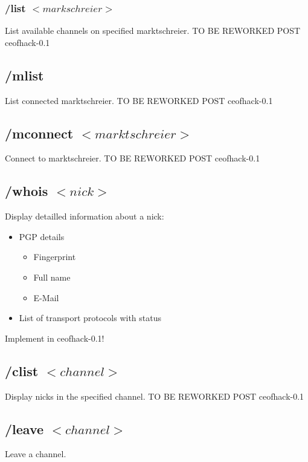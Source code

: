 \documentclass[12pt,a4paper]{book}
\begin{document}
\subsubsection{/list $<markschreier>$}
List available channels on specified marktschreier.
TO BE REWORKED
POST ceofhack-0.1

\subsection{/mlist}
List connected marktschreier.
TO BE REWORKED
POST ceofhack-0.1

\subsection{/mconnect $<marktschreier>$}
Connect to marktschreier.
TO BE REWORKED
POST ceofhack-0.1

\subsection{/whois $<nick>$}
Display detailled information about a nick:
\begin{itemize}
\item PGP details
\begin{itemize}
\item Fingerprint
\item Full name
\item E-Mail
\end{itemize}
\item List of transport protocols with status
\end{itemize}

Implement in ceofhack-0.1!
\subsection{/clist $<channel>$}
Display nicks in the specified channel.
TO BE REWORKED
POST ceofhack-0.1

\subsection{/leave $<channel>$}
Leave a channel.
\end{document}
